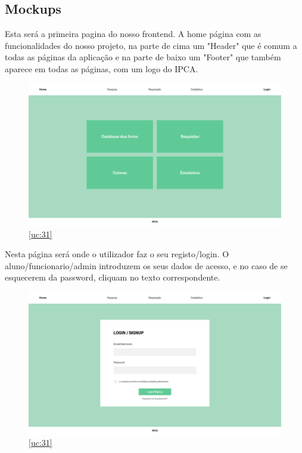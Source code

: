 \subsection*{Mockups}

Esta será a primeira pagina do nosso frontend. A home página com as funcionalidades do nosso projeto, na parte de cima um "Header" que é comum a todas as páginas da aplicação e na parte de baixo um "Footer" que também aparece em todas as páginas, com um logo do IPCA.

\begin{figure}[H]
	\centering
	\includegraphics[width=1\linewidth]{../Mockups/PNGs/Home.png}  %
	\caption{\ref{uc:31}}
	\label{fig:chap230}
\end{figure}


\newpage 

Nesta página será onde o utilizador faz o seu registo/login. O aluno/funcionario/admin introduzem os seus dados de acesso, e no caso de se esquecerem da password, cliquam no texto correspondente.

\begin{figure}[H]
	\centering
	\includegraphics[width=1\linewidth]{../Mockups/PNGs/Login - Signup.png}  %
	\caption{\ref{uc:31}}
	\label{fig:chap230}
\end{figure}


